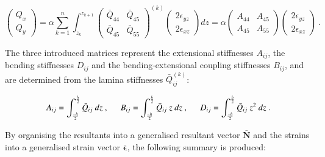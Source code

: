 \begin{equation} 
			\begin{pmatrix}
			Q_{x} \\
			Q_{y} 
			\end{pmatrix}
		= \alpha
		\sum_{k=1}^n
		\int_{z_k}^{z_{k+1}}
			{\begin{pmatrix}
			\bar{Q}_{44} & \bar{Q}_{45} \\
			\bar{Q}_{45} & \bar{Q}_{55} 
			\end{pmatrix}}^{(k)}
			\begin{pmatrix}
			2\epsilon_{yz} \\
			2\epsilon_{xz} 
			\end{pmatrix}
		dz
		= \alpha
			{\begin{pmatrix}
			{A}_{44} & {A}_{45} \\
			{A}_{45} & {A}_{55} 
			\end{pmatrix}}
			\begin{pmatrix}
			2\epsilon_{yz} \\
			2\epsilon_{xz} 
			\end{pmatrix}
		\label{eqscomp_laminate_constitutive5}\ .
\end{equation}

The three introduced matrices represent the extensional stiffnesses $A_{ij}$, the bending stiffnesses $D_{ij}$ and the bending-extensional coupling stiffnesses $B_{ij}$, and are determined from the lamina stiffnesses $\bar{Q}_{ij}^{(k)}$:

\begin{equation} 
	A_{ij} = 
	\int_{\frac{-h}{2}}^{\frac{h}{2}}
	\bar{Q}_{ij}
	\ dz\ ,
	\hspace{5mm}
	B_{ij} = 
	\int_{\frac{-h}{2}}^{\frac{h}{2}}
	\bar{Q}_{ij}\ z
	\ dz\ ,
	\hspace{5mm}
	D_{ij} = 
	\int_{\frac{-h}{2}}^{\frac{h}{2}}
	\bar{Q}_{ij}\ z^2
	\ dz
	\label{eqscomp_laminate_constitutive6}\ .
\end{equation}

By organising the resultants into a generalised resultant vector $\bar{\mathbf{N}}$ and the strains into a generalised strain vector $\bar{\boldsymbol{\epsilon}}$, the following summary is produced:

